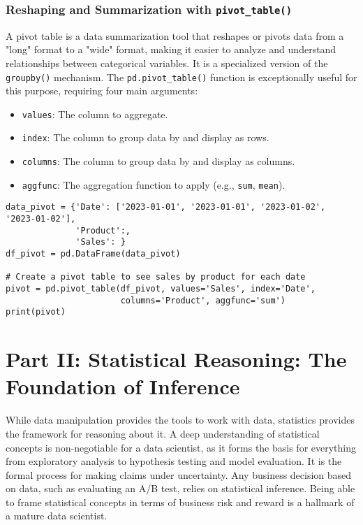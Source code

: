 \documentclass[11pt,a4paper]{article}
\begin{document}
\subsubsection{Reshaping and Summarization with \texttt{pivot\_table()}}

A pivot table is a data summarization tool that reshapes or pivots data from a "long" format to a "wide" format, making it easier to analyze and understand relationships between categorical variables. It is a specialized version of the \texttt{groupby()} mechanism. The \texttt{pd.pivot\_table()} function is exceptionally useful for this purpose, requiring four main arguments:
\begin{itemize}
    \item \texttt{values}: The column to aggregate.
    \item \texttt{index}: The column to group data by and display as rows.
    \item \texttt{columns}: The column to group data by and display as columns.
    \item \texttt{aggfunc}: The aggregation function to apply (e.g., \texttt{sum}, \texttt{mean}).
\end{itemize}

\begin{lstlisting}
data_pivot = {'Date': ['2023-01-01', '2023-01-01', '2023-01-02', '2023-01-02'],
              'Product':,
              'Sales': }
df_pivot = pd.DataFrame(data_pivot)

# Create a pivot table to see sales by product for each date
pivot = pd.pivot_table(df_pivot, values='Sales', index='Date',
                       columns='Product', aggfunc='sum')
print(pivot)
\end{lstlisting}

\section{Part II: Statistical Reasoning: The Foundation of Inference}

While data manipulation provides the tools to work with data, statistics provides the framework for reasoning about it. A deep understanding of statistical concepts is non-negotiable for a data scientist, as it forms the basis for everything from exploratory analysis to hypothesis testing and model evaluation. It is the formal process for making claims under uncertainty. Any business decision based on data, such as evaluating an A/B test, relies on statistical inference. Being able to frame statistical concepts in terms of business risk and reward is a hallmark of a mature data scientist.
\end{document}
